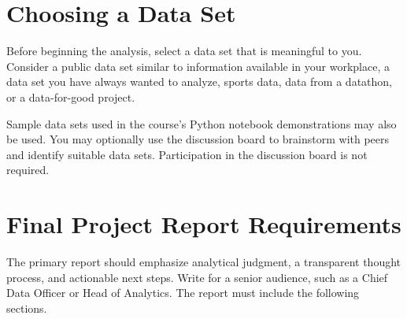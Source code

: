 \documentclass[11pt,letterpaper]{article}
\begin{document}
\section{Choosing a Data Set}

Before beginning the analysis, select a data set that is meaningful to you.
Consider a public data set similar to information available in your workplace,
a data set you have always wanted to analyze, sports data, data from a
datathon, or a data-for-good project.

Sample data sets used in the course's Python notebook demonstrations may also
be used. You may optionally use the discussion board to brainstorm with peers
and identify suitable data sets. Participation in the discussion board is not
required.

\section{Final Project Report Requirements}

The primary report should emphasize analytical judgment, a transparent
thought process, and actionable next steps. Write for a senior audience, such
as a Chief Data Officer or Head of Analytics. The report must include the
following sections.
\end{document}
